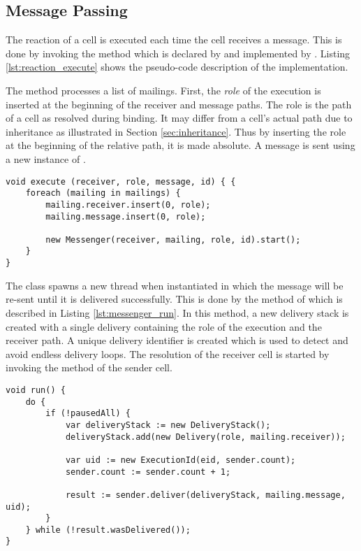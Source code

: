 \subsection{Message Passing}

The reaction of a cell is executed each time the cell receives a message. This is done by invoking the method  which is declared by  and implemented by . Listing \ref{lst:reaction_execute} shows the pseudo-code description of the implementation. 

The method processes a list of mailings. First, the \textit{role} of the execution is inserted at the beginning of the receiver and message paths. The role is the path of a cell as resolved during binding. It may differ from a cell's actual path due to inheritance as illustrated in Section \ref{sec:inheritance}. Thus by inserting the role at the beginning of the relative path, it is made absolute. A message is sent using a new instance of .

\begin{lstlisting}[mathescape, float=hbt, label=lst:reaction_execute, 
caption=Execute method of Reaction]
void execute (receiver, role, message, id) { {
	foreach (mailing in mailings) {
		mailing.receiver.insert(0, role);
		mailing.message.insert(0, role);
		
		new Messenger(receiver, mailing, role, id).start();
	}
}
\end{lstlisting}

The class  spawns a new thread when instantiated in which the message will be re-sent until it is delivered successfully. This is done by the method  of  which is described in Listing \ref{lst:messenger_run}. In this method, a new delivery stack is created with a single delivery containing the role of the execution and the receiver path. A unique delivery identifier is created which is used to detect and avoid endless delivery loops. The resolution of the receiver cell is started by invoking the  method of the sender cell.

\begin{lstlisting}[mathescape, float=hbt, label=lst:messenger_run, 
caption=Run method of Messenger]
void run() {
	do {
		if (!pausedAll) {
			var deliveryStack := new DeliveryStack();
			deliveryStack.add(new Delivery(role, mailing.receiver));

			var uid := new ExecutionId(eid, sender.count);
			sender.count := sender.count + 1;

			result := sender.deliver(deliveryStack, mailing.message, uid);
		}
	} while (!result.wasDelivered());
}
\end{lstlisting}


